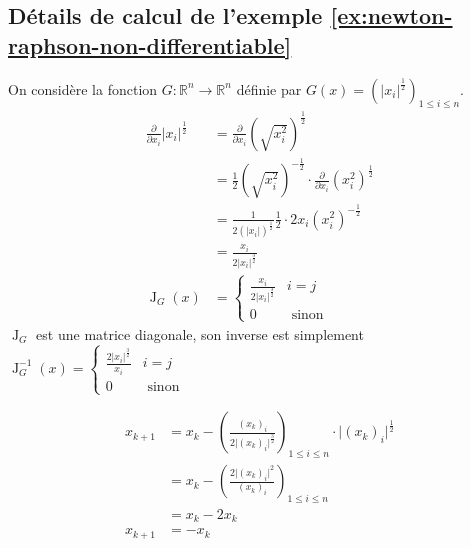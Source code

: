 \documentclass[3p, twocolumn]{elsarticle}
\DeclareMathOperator{\Jacobian}{J}
\begin{document}
\begin{appendices}
    \section{Détails de calcul de l'exemple \ref{ex:newton-raphson-non-differentiable}}
    \label{ap:calcul-exemple-nr}
    On considère la fonction $G:\mathbb R^n\rightarrow \mathbb R^n$ définie par $G(x)=\left(\lvert x_i\rvert^{\frac12}\right)_{1\leq i\leq n}$.
    \begin{align*}
        \frac{\partial}{\partial x_i}\lvert x_i\rvert^{\frac12} & = \frac{\partial}{\partial x_i}\left(\sqrt{x_i^2}\right)^{\frac12}                                          \\
                                                                & = \frac12\left(\sqrt{x_i^2}\right)^{-\frac12}\cdot\frac{\partial}{\partial x_i}\left(x_i^2\right)^{\frac12} \\
                                                                & = \frac1{2(\lvert x_i\rvert)^{\frac12}}\frac12\cdot2x_i(x_i^2)^{-\frac12}                                   \\
                                                                & = \frac{x_i}{2\lvert x_i\rvert^{\frac32}}                                                                   \\
        \Jacobian_G(x)                                          & = \begin{cases}
            \frac{x_i}{2\lvert x_i\rvert^{\frac32}} & i=j             \\
            0                                       & \textrm{ sinon}
        \end{cases}
    \end{align*}
    $\Jacobian_G$ est une matrice diagonale, son inverse est simplement $\Jacobian^{-1}_G(x)=\begin{cases}\frac{2\lvert x_i\rvert^{\frac32}}{x_i}&i=j\\0&\textrm{ sinon}\end{cases}$

    \begin{align*}
        x_{k+1} & = x_k - \left(\frac{(x_k)_i}{2\lvert (x_k)_i\rvert^{\frac32}}\right)_{1\leq i\leq n}\cdot \lvert (x_k)_i\vert ^{\frac12} \\
                & = x_k - \left(\frac{2\lvert (x_k)_i \rvert^{2}}{(x_k)_i}\right)_{1\leq i\leq n}\\
                & = x_k - 2x_k\\
        x_{k+1} & = - x_k
    \end{align*}
\end{appendices}




{}
\end{document}
